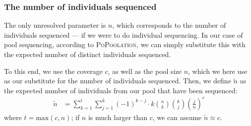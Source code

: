 \documentclass[a4paper,fontsize=9pt,DIV=14]{scrartcl}
\newcounter{todo}
\newcounter{popoolissue}
\newcommand\todo[1]{}
\newcommand\popoolissue[1]{}
\newcommand\toolname{\textsc}
\newcommand{\coverage}{c}
\begin{document}
\popoolissue{Another small issue: The computation of alpha* requires ``effective coverage'' to be larger than 1, see \href{https://github.com/lczech/popoolation/blob/092e7a6f7ee4910c1bec4377e0adccc353175bc8/Modules/VarMath.pm\#L226}{here}, but tests this against $n$, which is the number of individuals. Are we missing something here?}

\popoolissue{Furthermore, we tested the computation of alpha*, and it also gives NaN values for input 2 and 3, so the test should in fact be $>= 4$ instead.}


\subsubsection*{The number of individuals sequenced}

The only unresolved parameter is $n$, which corresponds to the number of individuals sequenced ---
if we were to do individual sequencing.
In our case of pool sequencing, according to \toolname{PoPoolation},
we can simply substitute this with the expected number of distinct individuals sequenced.

To this end, we use the coverage $\coverage$, as well as the pool size $n$, which we here use as our substitute for the number of individuals sequenced.
Then, we define $\tilde{n}$ as the expected number of individuals from our pool that have been sequenced:
%
\begin{align}
    \label{eq:IndivSeqBruteForce}
    \tilde{n}
    &= \sum_{k=1}^{t} \sum_{j=1}^{k} (-1)^{k-j} \cdot k \binom{n}{k} \binom{k}{j} \left(\frac{j}{n}\right)^\coverage
\end{align}
%
where $t=\text{max}(\coverage, n)$; if $n$ is much larger than $\coverage$, we can assume $\tilde{n} \approx \coverage$.
\end{document}
